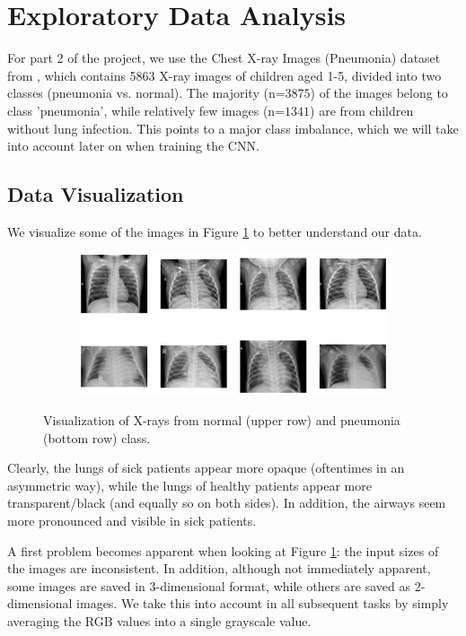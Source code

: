 \section{Exploratory Data Analysis}

For part 2 of the project, we use the Chest X-ray Images (Pneumonia) dataset from \cite{Kermany2018-ms}, which contains 5863 X-ray images of children aged 1-5, divided into two classes (pneumonia vs. normal). The majority (n=$3875$) of the images belong to class 'pneumonia', while relatively few images (n=$1341$) are from children without lung infection. This points to a major class imbalance, which we will take into account later on when training the CNN.

\subsection{Data Visualization}

We visualize some of the images in Figure \ref{fig:samples} to better understand our data.

\begin{figure}[H]
    \centering
    \begin{subfigure}{\columnwidth}
        \includegraphics[width=1\textwidth]{images/samples.png}
    \end{subfigure}
    \caption{Visualization of X-rays from normal (upper row) and pneumonia (bottom row) class.}
    \label{fig:samples}
\end{figure}
Clearly, the lungs of sick patients appear more opaque (oftentimes in an asymmetric way), while the lungs of healthy patients appear more transparent/black (and equally so on both sides). In addition, the airways seem more pronounced and visible in sick patients.

A first problem becomes apparent when looking at Figure \ref{fig:samples}: the input sizes of the images are inconsistent. In addition, although not immediately apparent, some images are saved in 3-dimensional format, while others are saved as 2-dimensional images. We take this into account in all subsequent tasks by simply averaging the RGB values into a single grayscale value.


